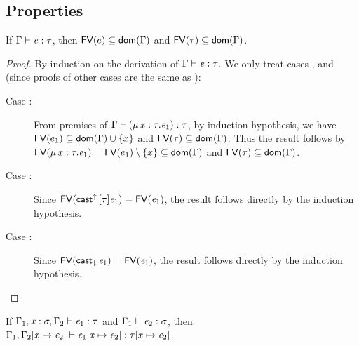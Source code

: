 \subsection{Properties}
\begin{lem}\label{lem:free}
    If $\Gamma  \vdash  \mathit{e}  :  \tau$, then $\mathsf{FV}(e) \subseteq \mathsf{dom}(\Gamma)$ and $\mathsf{FV}(\tau) \subseteq \mathsf{dom}(\Gamma)$.
\end{lem}

\begin{proof}
    By induction on the derivation of $\Gamma  \vdash  \mathit{e}  :  \tau$. We only treat cases ,  and  (since proofs of other cases are the same as \cc \cite{handbook}):
    \begin{description}
        \item[Case :] From premises of $\Gamma  \vdash  (  \mu \, \mathit{x}  :  \tau  .  \mathit{e_{{\mathrm{1}}}}  )  :  \tau$, by induction hypothesis, we have $\mathsf{FV}(e_1) \subseteq \mathsf{dom}(\Gamma) \cup \{x\}$ and $\mathsf{FV}(\tau) \subseteq \mathsf{dom}(\Gamma)$. Thus the result follows by $\mathsf{FV}(\mu \, \mathit{x}  :  \tau  .  \mathit{e_{{\mathrm{1}}}})=\mathsf{FV}(e_1) \setminus \{x\} \subseteq \mathsf{dom}(\Gamma)$ and $\mathsf{FV}(\tau) \subseteq \mathsf{dom}(\Gamma)$.
        \item[Case :] Since $\mathsf{FV}(\mathsf{cast}^{\uparrow} \, [  \tau  ]  \mathit{e_{{\mathrm{1}}}})=\mathsf{FV}(\mathit{e_{{\mathrm{1}}}})$, the result follows directly by the induction hypothesis.
        \item[Case :] Since $\mathsf{FV}(\mathsf{cast}_{\downarrow} \, \mathit{e_{{\mathrm{1}}}})=\mathsf{FV}(\mathit{e_{{\mathrm{1}}}})$, the result follows directly by the induction hypothesis.
    \end{description}
\end{proof}

\begin{lem}\label{lem:subst}
	If $\Gamma_{{\mathrm{1}}}  ,  \mathit{x}  :  \sigma  ,  \Gamma_{{\mathrm{2}}}  \vdash  \mathit{e_{{\mathrm{1}}}}  :  \tau$ and $\Gamma_{{\mathrm{1}}}  \vdash  \mathit{e_{{\mathrm{2}}}}  :  \sigma$, then $\Gamma_{{\mathrm{1}}}  ,  \Gamma_{{\mathrm{2}}}  [  \mathit{x}  \mapsto  \mathit{e_{{\mathrm{2}}}}  ]  \vdash  \mathit{e_{{\mathrm{1}}}}  [  \mathit{x}  \mapsto  \mathit{e_{{\mathrm{2}}}}  ]  :  \tau  [  \mathit{x}  \mapsto  \mathit{e_{{\mathrm{2}}}}  ]$.
\end{lem}

